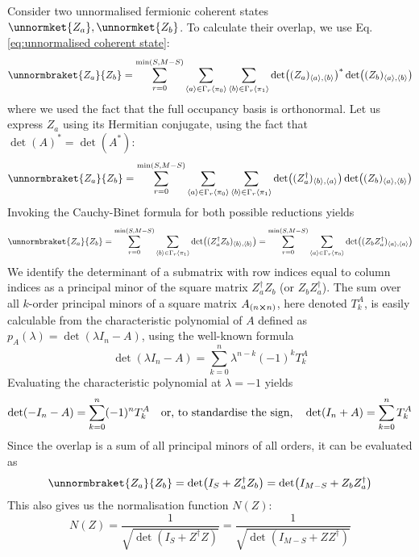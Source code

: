 \documentclass[12pt]{article}
\newcommand{\seq}[1]{\langle #1\rangle}
\newcommand{\hc}{^\dagger}
\begin{document}
	Consider two unnormalised fermionic coherent states $\unnormket{Z_a}, \unnormket{Z_b}$. To calculate their overlap, we use Eq. \ref{eq:unnormalised coherent state}:
	\begin{equation}
	\unnormbraket{Z_a}{Z_b}=\sum_{r=0}^{\min(S,M-S)}\sum_{\seq{a}\in\Gamma_r\seq{\pi_0}}\sum_{\seq{b}\in\Gamma_r\seq{\pi_1}}\det((Z_a)_{\seq{a},\seq{b}})^*\det((Z_b)_{\seq{a},\seq{b}})
	\end{equation}
	where we used the fact that the full occupancy basis is orthonormal. Let us express $Z_a$ using its Hermitian conjugate, using the fact that $\det(A)^*=\det(A^*)$:
	\begin{equation}
	\unnormbraket{Z_a}{Z_b}=\sum_{r=0}^{\min(S,M-S)}\sum_{\seq{a}\in\Gamma_r\seq{\pi_0}}\sum_{\seq{b}\in\Gamma_r\seq{\pi_1}}\det((Z_a\hc)_{\seq{b}, \seq{a}})\det((Z_b)_{\seq{a},\seq{b}})
	\end{equation}
	Invoking the Cauchy-Binet formula for both possible reductions yields
	\begin{equation}
	\unnormbraket{Z_a}{Z_b}=\sum_{r=0}^{\min(S,M-S)}\sum_{\seq{b}\in\Gamma_r\seq{\pi_1}}\det((Z_a\hc Z_b)_{\seq{b}, \seq{b}})=\sum_{r=0}^{\min(S,M-S)}\sum_{\seq{a}\in\Gamma_r\seq{\pi_0}}\det((Z_b Z_a\hc)_{\seq{a}, \seq{a}})
	\end{equation}
	We identify the determinant of a submatrix with row indices equal to column indices as a principal minor of the square matrix $Z_a\hc Z_b$ (or $Z_b Z_a\hc$). The sum over all $k$-order principal minors of a square matrix $A_{(n\cross n)}$, here denoted $T^A_k$, is easily calculable from the characteristic polynomial of $A$ defined as $p_A(\lambda)=\det(\lambda I_n-A)$, using the well-known formula
	\begin{equation}
	\det(\lambda I_n-A)=\sum_{k=0}^n \lambda^{n-k}(-1)^k T^A_k
	\end{equation}
	Evaluating the characteristic polynomial at $\lambda = -1$ yields
	\begin{equation}
	\det(-I_n-A)=\sum_{k=0}^n (-1)^n T^A_k\qq{or, to standardise the sign,} \det(I_n+A)=\sum_{k=0}^n T^A_k
	\end{equation}
	Since the overlap is a sum of all principal minors of all orders, it can be evaluated as
	\begin{equation}
	\unnormbraket{Z_a}{Z_b}=\det(I_{S}+Z_a\hc Z_b)=\det(I_{M-S}+Z_b Z_a\hc)
	\end{equation}
	This also gives us the normalisation function $N(Z)$:
	\begin{equation}
	N(Z)=\frac{1}{\sqrt{\det(I_{S}+Z\hc Z)}}=\frac{1}{\sqrt{\det(I_{M-S}+ZZ\hc)}}
	\end{equation}
	
\end{document}
